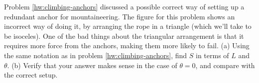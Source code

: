Problem \ref{hw:climbing-anchors} discussed a possible correct way of setting up a redundant anchor for
mountaineering. The figure for this problem shows an incorrect way of doing it, by arranging the
rope in a triangle (which we'll take to be isoceles). One of the bad things about the triangular
arrangement is that it requires more force from the anchors, making them more likely to fail.
(a) Using the same notation as in problem \ref{hw:climbing-anchors},
find  $S$ in terms of $L$ and $\theta$.  \answercheck\hwendpart
(b) Verify that your answer makes sense in the case of $\theta=0$, and compare with the correct
setup.\hwendpart
